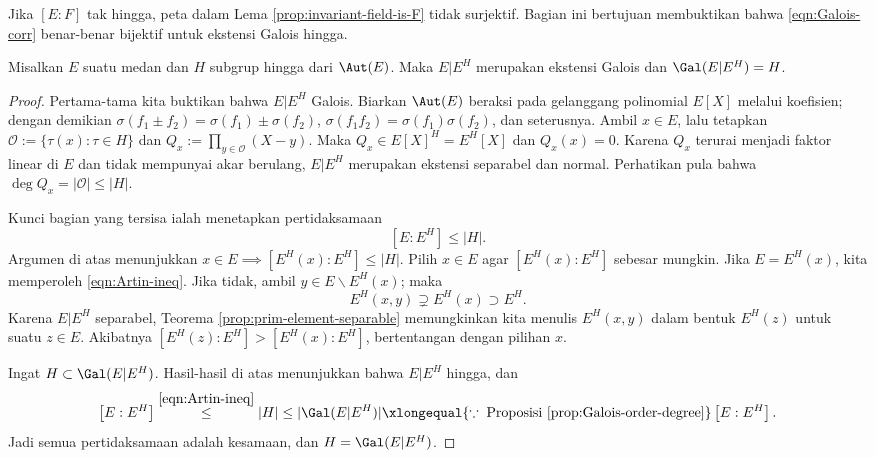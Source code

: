 Jika $[E:F]$ tak hingga, peta dalam Lema \ref{prop:invariant-field-is-F} tidak surjektif. Bagian ini bertujuan membuktikan bahwa \eqref{eqn:Galois-corr} benar-benar bijektif untuk ekstensi Galois hingga.
\begin{lemma}[E.\ Artin]\label{prop:invariant-field-Galois-finite}
	Misalkan $E$ suatu medan dan $H$ subgrup hingga dari $\Aut(E)$. Maka $E|E^H$ merupakan ekstensi Galois dan $\Gal(E|E^H)=H$.
\end{lemma}
\begin{proof}
	Pertama-tama kita buktikan bahwa $E|E^H$ Galois. Biarkan $\Aut(E)$ beraksi pada gelanggang polinomial $E[X]$ melalui koefisien; dengan demikian $\sigma(f_1\pm f_2)=\sigma(f_1)\pm\sigma(f_2)$, $\sigma(f_1f_2)=\sigma(f_1)\sigma(f_2)$, dan seterusnya. Ambil $x\in E$, lalu tetapkan $\mathcal{O}:=\{\tau(x):\tau\in H\}$ dan $Q_x:=\prod_{y\in\mathcal{O}}(X-y)$. Maka $Q_x\in E[X]^H=E^H[X]$ dan $Q_x(x)=0$. Karena $Q_x$ terurai menjadi faktor linear di $E$ dan tidak mempunyai akar berulang, $E|E^H$ merupakan ekstensi separabel dan normal. Perhatikan pula bahwa $\deg Q_x=|\mathcal{O}|\leq|H|$.
	
	Kunci bagian yang tersisa ialah menetapkan pertidaksamaan
	\begin{equation}\label{eqn:Artin-ineq}
		\left[ E:E^H \right] \leq |H|.
	\end{equation}
	Argumen di atas menunjukkan $x\in E\implies[E^H(x):E^H]\leq|H|$. Pilih $x\in E$ agar $[E^H(x):E^H]$ sebesar mungkin. Jika $E=E^H(x)$, kita memperoleh \eqref{eqn:Artin-ineq}. Jika tidak, ambil $y\in E\smallsetminus E^H(x)$; maka
	\[ E^H(x,y) \supsetneq E^H(x) \supset E^H. \]
	Karena $E|E^H$ separabel, Teorema \ref{prop:prim-element-separable} memungkinkan kita menulis $E^H(x,y)$ dalam bentuk $E^H(z)$ untuk suatu $z \in E$. Akibatnya $[E^H(z):E^H] > [E^H(x):E^H]$, bertentangan dengan pilihan $x$.
	
	Ingat $H\subset\Gal(E|E^H)$. Hasil-hasil di atas menunjukkan bahwa $E|E^H$ hingga, dan
	\[ \left[ E:E^H \right] \stackrel{\eqref{eqn:Artin-ineq}}{\leq} |H| \leq |\Gal(E|E^H)| \xlongequal{\because\; \text{Proposisi \ref{prop:Galois-order-degree}}} \left[ E:E^H \right]. \]
	Jadi semua pertidaksamaan adalah kesamaan, dan $H=\Gal(E|E^H)$.
\end{proof}

